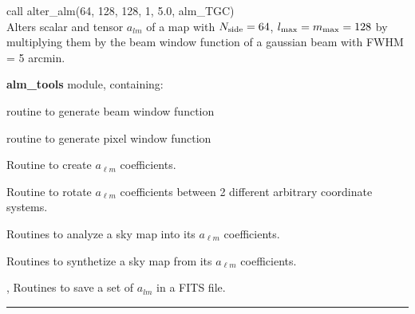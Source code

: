 \begin{example}
{
call alter\_alm(64, 128, 128, 1, 5.0, alm\_TGC)  \\
}
{
Alters scalar and tensor $a_{lm}$ of a map with $\nside=64$, $\ell_{\rm
  max}=m_{\rm max} = 128$ by multiplying them by the beam window function of a
gaussian beam with FWHM = 5 arcmin.
}
\end{example}

\begin{modules}
  \begin{sulist}{} %
  \item[\textbf{alm\_tools}] module, containing:
	\item[\htmlref{generate\_beam}{sub:generate_beam}] routine to generate beam window function
	\item[\htmlref{pixel\_window}{sub:pixel_window}] routine to generate pixel window function
  \end{sulist}
\end{modules}

\begin{related}
  \begin{sulist}{} %
  \item[\htmlref{create\_alm}{sub:create_alm}] Routine to create $a_{\ell m}$ coefficients.
  \item[\htmlref{rotate\_alm}{sub:rotate_alm}] Routine to rotate $a_{\ell m}$
  coefficients between 2 different arbitrary coordinate systems.
  \item[\htmlref{map2alm}{sub:map2alm}]  Routines to analyze a \healpix sky map into its $a_{\ell m}$
  coefficients.
  \item[\htmlref{alm2map}{sub:alm2map}] Routines to synthetize a \healpix sky map from its $a_{\ell m}$
  coefficients.
  \item[\htmlref{alms2fits}{sub:alms2fits}, \htmlref{dump\_alms}{sub:dump_alms}]
  Routines to save a set of $a_{lm}$ in a FITS file.  
  \end{sulist}
\end{related}

\rule{\hsize}{2mm}

\newpage
